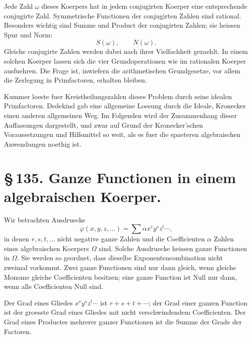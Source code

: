 \documentclass[11pt]{article}
\begin{document}
Jede Zahl \(\omega\) dieses Koerpers hat in jedem conjugirten Koerper
eine entsprechende conjugirte Zahl. Symmetrische Functionen der
conjugirten Zahlen sind rational. Besonders wichtig sind Summe und
Product der conjugirten Zahlen; sie heissen Spur und Norm:
\[
S(\omega),\qquad N(\omega).
\]
Gleiche conjugirte Zahlen werden dabei nach ihrer Vielfachheit
gezaehlt. In einem solchen Koerper lassen sich die vier
Grundoperationen wie im rationalen Koerper ausfuehren. Die Frage ist,
inwiefern die arithmetischen Grundgesetze, vor allem die Zerlegung in
Primfactoren, erhalten bleiben.

Kummer loeste fuer Kreistheilungszahlen dieses Problem durch seine
idealen Primfactoren. Dedekind gab eine allgemeine Loesung durch die
Ideale, Kronecker einen anderen allgemeinen Weg. Im Folgenden wird
der Zusammenhang dieser Auffassungen dargestellt, und zwar auf Grund
der Kronecker'schen Voraussetzungen und Hilfsmittel so weit, als es
fuer die spaeteren algebraischen Anwendungen noethig ist.

\section*{\S\,135. Ganze Functionen in einem algebraischen Koerper.}

Wir betrachten Ausdruecke
\begin{equation}
\varphi(x,y,z,\ldots)=\sum \alpha x^r y^s z^t\cdots ,
\tag{1}
\end{equation}
in denen \(r,s,t,\ldots\) nicht negative ganze Zahlen und die
Coefficienten \(\alpha\) Zahlen eines algebraischen Koerpers \(\Omega\)
sind. Solche Ausdruecke heissen ganze Functionen in \(\Omega\). Sie
werden so geordnet, dass dieselbe Exponentencombination nicht zweimal
vorkommt. Zwei ganze Functionen sind nur dann gleich, wenn gleiche
Monome gleiche Coefficienten besitzen; eine ganze Function ist Null
nur dann, wenn alle Coefficienten Null sind.

Der Grad eines Gliedes \(x^r y^s z^t\cdots\) ist
\(r+s+t+\cdots\); der Grad einer ganzen Function ist der groesste
Grad eines Gliedes mit nicht verschwindendem Coefficienten. Der Grad
eines Productes mehrerer ganzer Functionen ist die Summe der Grade
der Factoren.
\end{document}
